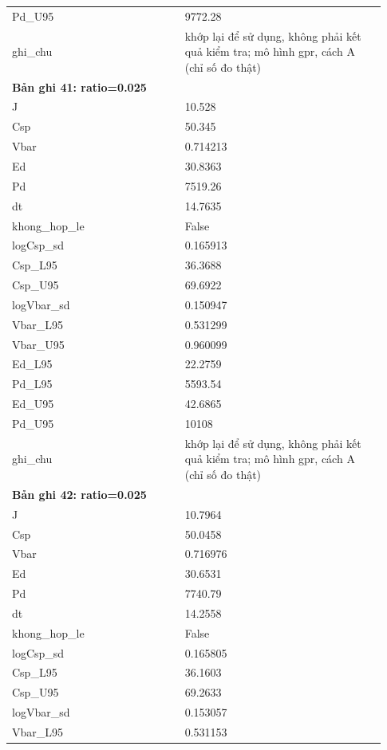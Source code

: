 \begin{longtable}{p{0.43\linewidth}p{0.50\linewidth}}
Pd\_\allowbreak U95 & 9772.28 \\
ghi\_\allowbreak chu & khớp lại để sử dụng, không phải kết quả kiểm tra; mô hình gpr, cách A (chỉ số đo thật) \\
\midrule
\multicolumn{2}{p{0.95\linewidth}}{\textbf{Bản ghi 41: ratio=0.025}} \\
J & 10.528 \\
Csp & 50.345 \\
Vbar & 0.714213 \\
Ed & 30.8363 \\
Pd & 7519.26 \\
dt & 14.7635 \\
khong\_\allowbreak hop\_\allowbreak le & False \\
logCsp\_\allowbreak sd & 0.165913 \\
Csp\_\allowbreak L95 & 36.3688 \\
Csp\_\allowbreak U95 & 69.6922 \\
logVbar\_\allowbreak sd & 0.150947 \\
Vbar\_\allowbreak L95 & 0.531299 \\
Vbar\_\allowbreak U95 & 0.960099 \\
Ed\_\allowbreak L95 & 22.2759 \\
Pd\_\allowbreak L95 & 5593.54 \\
Ed\_\allowbreak U95 & 42.6865 \\
Pd\_\allowbreak U95 & 10108 \\
ghi\_\allowbreak chu & khớp lại để sử dụng, không phải kết quả kiểm tra; mô hình gpr, cách A (chỉ số đo thật) \\
\midrule
\multicolumn{2}{p{0.95\linewidth}}{\textbf{Bản ghi 42: ratio=0.025}} \\
J & 10.7964 \\
Csp & 50.0458 \\
Vbar & 0.716976 \\
Ed & 30.6531 \\
Pd & 7740.79 \\
dt & 14.2558 \\
khong\_\allowbreak hop\_\allowbreak le & False \\
logCsp\_\allowbreak sd & 0.165805 \\
Csp\_\allowbreak L95 & 36.1603 \\
Csp\_\allowbreak U95 & 69.2633 \\
logVbar\_\allowbreak sd & 0.153057 \\
Vbar\_\allowbreak L95 & 0.531153 \\

\end{longtable}

